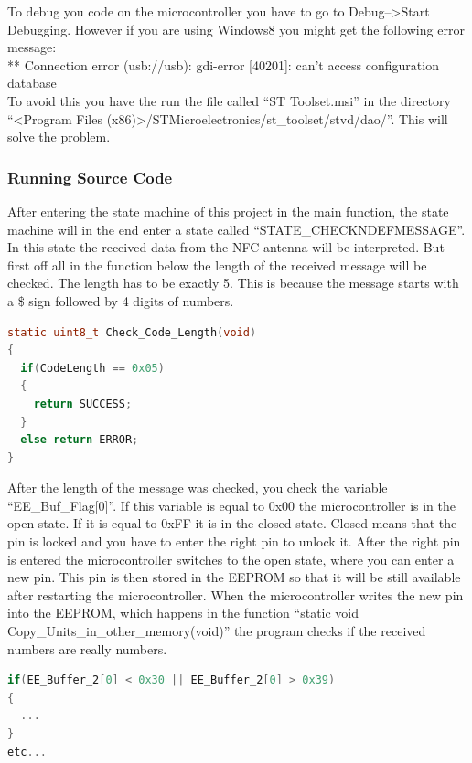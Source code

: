 \documentclass[11pt]{article}
\begin{document}
To debug you code on the microcontroller you have to go to Debug-->Start Debugging. However if you are using Windows8 you might get the following error message:\\
** Connection error (usb://usb): gdi-error [40201]: can't access configuration database\\

To avoid this you have the run the file called "`ST Toolset.msi"' in the directory "`<Program Files (x86)>/STMicroelectronics/st\_toolset/stvd/dao/"'. This will solve the problem.

\subsubsection{Running Source Code}

After entering the state machine of this project in the main function, the state machine will in the end enter a state called "`STATE\_CHECKNDEFMESSAGE"'. In this state the received data from the NFC antenna will be interpreted. But first off all in the function below the length of the received message will be checked. The length has to be exactly 5. This is because the message starts with a \$ sign followed by 4 digits of numbers.

\begin{lstlisting}[language=c]
static uint8_t Check_Code_Length(void)
{
  if(CodeLength == 0x05)
  {
  	return SUCCESS;
  }
  else return ERROR;
}
\end{lstlisting}

After the length of the message was checked, you check the variable "`EE\_Buf\_Flag[0]"'. If this variable is equal to 0x00 the microcontroller is in the open state. If it is equal to 0xFF it is in the closed state.
Closed means that the pin is locked and you have to enter the right pin to unlock it. After the right pin is entered the microcontroller switches to the open state, where you can enter a new pin. This pin is then stored in the EEPROM so that it will be still available after restarting the microcontroller.
When the microcontroller writes the new pin into the EEPROM, which happens in the function "`static void Copy\_Units\_in\_other\_memory(void)"' the program checks if the received numbers are really numbers. 

\begin{lstlisting}[language=c]
if(EE_Buffer_2[0] < 0x30 || EE_Buffer_2[0] > 0x39)
{
  ...
}
etc...
\end{lstlisting}
\end{document}
